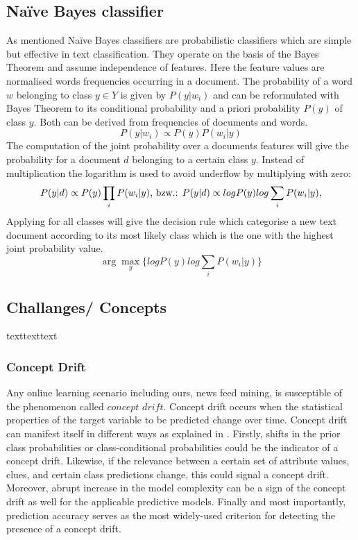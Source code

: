\documentclass[12pt]{article}
\begin{document}
\subsection{Na\"ive Bayes classifier}

As mentioned Na\"ive Bayes classifiers are probabilistic classifiers which are simple but effective in text classification. They operate on the basis of the Bayes Theorem and assume independence of features. Here the feature values are normalised  words frequencies occurring in a document. The probability of a word $w$ belonging to class $y \in Y$ is given by $P(y|w_i)$ and can be reformulated with Bayes Theorem to its conditional probability and a priori probability $ P(y)$ of class $y$. Both can be derived from frequencies of documents and words.
$$
P(y|w_i) \propto P(y)P(w_i|y)
$$
The computation of the joint probability over a documents features will give the probability for a  document $d$ belonging to a certain class $y$. Instead of multiplication the logarithm is used to avoid underflow by multiplying with zero:
$$
P(y|d) \propto P(y)\prod_i P(w_i|y)\space
\textrm{,  bzw.:    }
P(y|d) \propto log P(y) log \sum_i P(w_i|y),
$$
Applying for all classes will give the decision rule which categorise a new text document according to its most likely class which is the one with the highest joint probability value.
$$
\arg\max_y\{ log P(y) log \sum_i P(w_i|y)\}
$$

\subsection{Challanges/ Concepts}
texttexttext

\subsubsection{Concept Drift}
Any online learning scenario including ours, news feed mining, is susceptible of the phenomenon called $concept$ $drift$. Concept drift occurs when the statistical properties of the target variable to be predicted change over time. Concept drift can manifest itself in different ways as explained in \citep[p. 5]{KunchevaEnsembleOverview08} . Firstly, shifts in the prior class probabilities or class-conditional probabilities could be the indicator of a concept drift. Likewise, if the relevance between a certain set of attribute values, clues, and certain class predictions change, this could signal a concept drift. Moreover, abrupt increase in the model complexity can be a sign of the concept drift as well for the applicable predictive models. Finally and most importantly, prediction accuracy serves as the most widely-used criterion for detecting the presence of a concept drift. 
\end{document}
